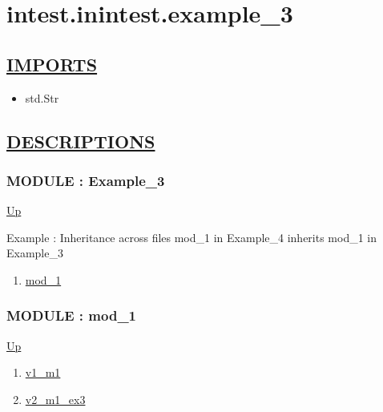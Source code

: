 \chapter*{intest.inintest.example\_3}
\hypertarget{ecldoc:toc:intest.inintest.example_3}{}

\section*{\underline{IMPORTS}}
\begin{itemize}
\item std.Str
\end{itemize}

\section*{\underline{DESCRIPTIONS}}
\subsection*{MODULE : Example\_3}
\hypertarget{ecldoc:intest.inintest.Example_3}{}
\par
\begin{minipage}[t]{\textwidth}
\begin{flushleft}
  
\end{flushleft}
\end{minipage}
\hyperlink{ecldoc:toc:intest/inintest}{Up} \\
\par
Example : Inheritance across files mod\_1 in Example\_4 inherits mod\_1 in Example\_3 \\
\par
\begin{enumerate}
\item \hyperlink{ecldoc:intest.inintest.Example_3.mod_1}{mod\_1}
\end{enumerate}
\subsection*{MODULE : mod\_1}
\hypertarget{ecldoc:intest.inintest.Example_3.mod_1}{}
\par
\begin{minipage}[t]{\textwidth}
\begin{flushleft}
  
\end{flushleft}
\end{minipage}
\hyperlink{ecldoc:intest.inintest.Example_3}{Up} \\
\par
\par
\begin{enumerate}
\item \hyperlink{ecldoc:intest.inintest.example_3.mod_1.v1_m1}{v1\_m1}
\item \hyperlink{ecldoc:intest.inintest.example_3.mod_1.v2_m1_ex3}{v2\_m1\_ex3}
\end{enumerate}
